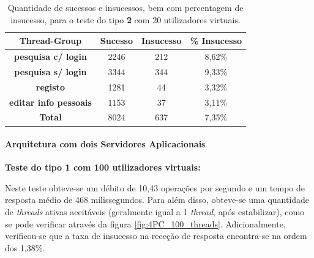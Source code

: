 \begin{table}[H]
\centering
\caption{Quantidade de sucessos e insucessos, bem com percentagem de insucesso, para o teste do tipo \textbf{2} com 20 utilizadores virtuais.}
\begin{tabular}{cccc}
\hline
\rowcolor[HTML]{EFEFEF} 
\textbf{Thread-Group}                  & \textbf{Sucesso} & \textbf{Insucesso} & \textbf{\% Insucesso} \\ \hline
\textbf{pesquisa c/ login}             & 2246             & 212                & 8,62\%                \\
\textbf{pesquisa s/ login}             & 3344             & 344                & 9,33\%                \\
\textbf{registo}                       & 1281             & 44                 & 3,32\%                \\
\textbf{editar info pessoais}          & 1153             & 37                 & 3,11\%                \\ \hline
\cellcolor[HTML]{EFEFEF}\textbf{Total} & 8024             & 637                & 7,35\%                \\ \hline
\end{tabular}
\end{table}


\paragraph{Arquitetura com dois Servidores Aplicacionais}\label{sec:app2}

\vspace{0.5cm}
\noindent\textbf{Teste do tipo 1 com 100 utilizadores virtuais:}

Neste teste obteve-se um débito de 10,43 operações por segundo e um tempo de resposta médio de 468 milissegundos. Para além disso, obteve-se uma quantidade de \textit{threads} ativas aceitáveis (geralmente igual a 1 \textit{thread}, após estabilizar), como se pode verificar através da figura \ref{fig:4PC_100_threads}. Adicionalmente, verificou-se que a taxa de insucesso na receção de resposta encontra-se na ordem dos 1,38\%.


